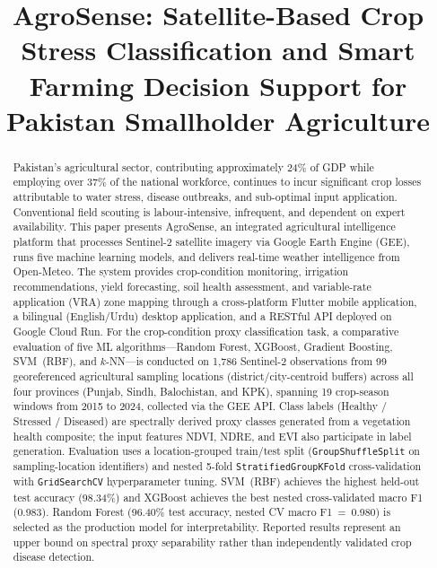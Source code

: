 \documentclass[conference]{IEEEtran}
\begin{document}
\title{AgroSense: Satellite-Based Crop Stress Classification and Smart Farming
       Decision Support for Pakistan Smallholder Agriculture}

\author{
}

\maketitle

\begin{abstract}
Pakistan's agricultural sector, contributing approximately 24\% of GDP while
employing over 37\% of the national workforce, continues to incur significant
crop losses attributable to water stress, disease outbreaks, and sub-optimal
input application. Conventional field scouting is labour-intensive, infrequent,
and dependent on expert availability. This paper presents AgroSense, an
integrated agricultural intelligence platform that processes Sentinel-2
satellite imagery via Google Earth Engine (GEE), runs five machine learning
models, and delivers real-time weather intelligence from Open-Meteo. The system
provides crop-condition monitoring, irrigation recommendations, yield
forecasting, soil health assessment, and variable-rate application (VRA) zone
mapping through a cross-platform Flutter mobile application, a bilingual
(English/Urdu) desktop application, and a RESTful API deployed on Google Cloud
Run. For the crop-condition proxy classification task, a comparative evaluation
of five ML algorithms---Random Forest, XGBoost, Gradient Boosting, SVM~(RBF),
and $k$-NN---is conducted on 1,786 Sentinel-2 observations from 99
georeferenced agricultural sampling locations (district/city-centroid buffers)
across all four provinces (Punjab, Sindh, Balochistan, and KPK), spanning 19
crop-season windows from 2015 to 2024, collected via the GEE API. Class labels
(Healthy / Stressed / Diseased) are spectrally derived proxy classes generated
from a vegetation health composite; the input features NDVI, NDRE, and EVI also
participate in label generation. Evaluation uses a location-grouped train/test
split (\texttt{GroupShuffleSplit} on sampling-location identifiers) and nested
5-fold \texttt{StratifiedGroupKFold} cross-validation with \texttt{GridSearchCV}
hyperparameter tuning. SVM~(RBF) achieves the highest held-out test accuracy
(98.34\%) and XGBoost achieves the best nested cross-validated macro F1 (0.983).
Random Forest (96.40\% test accuracy, nested CV macro F1~=~0.980) is selected
as the production model for interpretability. Reported results represent an
upper bound on spectral proxy separability rather than independently validated
crop disease detection.
\end{abstract}
\end{document}
